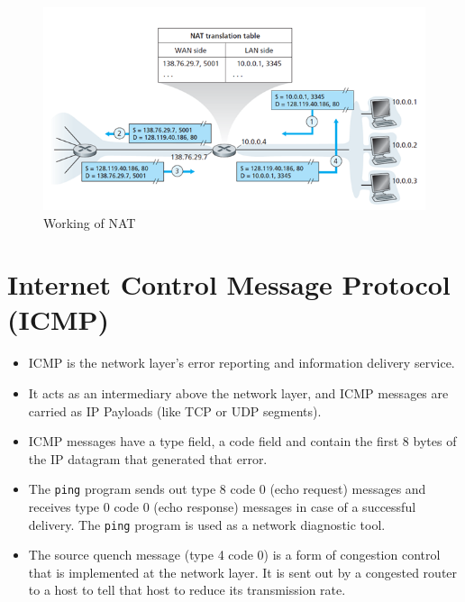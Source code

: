 \documentclass[a4paper]{article}
\theoremstyle{plain}
\theoremstyle{definition}
\begin{document}
\begin{figure}[!h]
    \centering
    \includegraphics[scale=0.8]{cn10.png}
    \caption{Working of NAT}
    \label{fig:my_label_10}
\end{figure}

\section{Internet Control Message Protocol (ICMP)}
\begin{itemize}
    \item ICMP is the network layer's error reporting and information delivery service.
    
    \item It acts as an intermediary above the network layer, and ICMP messages are carried as IP Payloads (like TCP or UDP segments). 
    
    \item ICMP messages have a type field, a code field and contain the first 8 bytes of the IP datagram that generated that error. 
    
    \item The \texttt{ping} program sends out type 8 code 0 (echo request) messages and receives type 0 code 0 (echo response) messages in case of a successful delivery. The \texttt{ping} program is used as a network diagnostic tool.
    
    \item The source quench message (type 4 code 0) is a form of congestion control that is implemented at the network layer. It is sent out by a congested router to a host to tell that host to reduce its transmission rate. 
\end{itemize}
\end{document}

